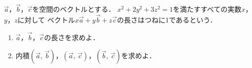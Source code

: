 \documentclass[../../main.tex]{subfiles}
\begin{document}
$\vec{a}$，$\vec{b}$，$\vec{c}$を空間のベクトルとする．
$x^2+2y^2+3z^2=1$を満たすすべての実数$x$，$y$，$z$に対して
ベクトル$x\vec{a}+y\vec{b}+z\vec{c}$の長さはつねに1であるという．
\begin{enumerate}
  \item $\vec{a}$，$\vec{b}$，$\vec{c}$の長さを求めよ．
  \item 内積$(\vec{a}, \, \vec{b})$，$(\vec{a}, \, \vec{c})$，$(\vec{b}, \, \vec{c})$を求めよ．
\end{enumerate}
\end{document}
